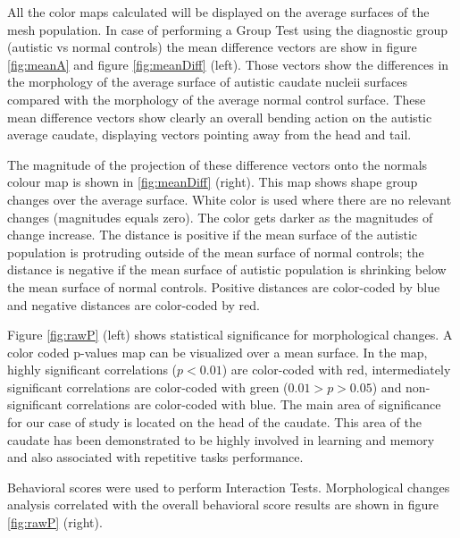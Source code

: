 \documentclass{InsightArticle}
\begin{document}
All the color maps calculated will be displayed on the average surfaces of the mesh population. In case of performing a Group Test using the diagnostic group (autistic vs normal controls) the mean difference vectors are show in figure \ref{fig:meanA} and figure \ref{fig:meanDiff} (left). Those vectors show the differences in the morphology of the average surface of autistic caudate nucleii surfaces compared with the morphology of the average normal control surface. These mean difference vectors show clearly an overall bending action on the autistic average caudate, displaying vectors pointing away from the head and tail. 

The magnitude of the projection of these difference vectors onto the normals colour map is shown in \ref{fig:meanDiff} (right). This map shows shape group changes over the average surface. White color is used where there are no relevant changes (magnitudes equals zero). The color gets darker as the magnitudes of change increase. The distance is positive if the mean surface of the autistic population is protruding outside of the mean surface of normal controls; the distance is negative if the mean surface of autistic population is shrinking below the mean surface of normal controls. Positive distances are color-coded by blue and negative distances are color-coded by red.

Figure \ref{fig:rawP} (left) shows statistical significance for morphological changes. A color coded p-values map can be visualized over a mean surface. In the map, highly significant correlations ($p < 0.01$) are color-coded with red, intermediately significant correlations are color-coded with green ($0.01 > p > 0.05$) and non-significant correlations are color-coded with blue. The main area of significance for our case of study is located on the head of the caudate. This area of the caudate has been demonstrated to be highly involved in learning and memory and also associated with repetitive tasks performance.

Behavioral scores were used to perform Interaction Tests. Morphological changes analysis correlated with the overall behavioral score results are shown in figure \ref{fig:rawP} (right).
\end{document}
